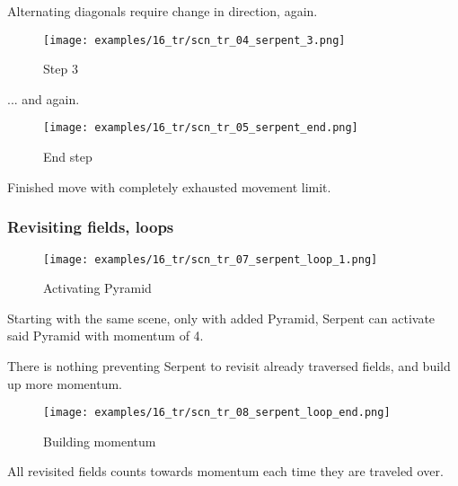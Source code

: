 Alternating diagonals require change in direction, again.

\clearpage %

\noindent
\begin{wrapfigure}[1]{l}{0.4\textwidth}
\centering
\texttt{[image: examples/16\_tr/scn\_tr\_04\_serpent\_3.png]}
\caption{Step 3}
\label{fig:scn_tr_04_serpent_3}
\end{wrapfigure}
... and again.

\vspace*{0.27\textheight}
\noindent
\begin{wrapfigure}[4]{l}{0.4\textwidth}
\centering
\texttt{[image: examples/16\_tr/scn\_tr\_05\_serpent\_end.png]}
\caption{End step}
\label{fig:scn_tr_05_serpent_end}
\end{wrapfigure}
Finished move with completely exhausted movement limit.

\clearpage %

\subsubsection*{Revisiting fields, loops}

\noindent
\begin{wrapfigure}[8]{l}{0.4\textwidth}
\centering
\texttt{[image: examples/16\_tr/scn\_tr\_07\_serpent\_loop\_1.png]}
\caption{Activating Pyramid}
\label{fig:scn_tr_07_serpent_loop_1}
\end{wrapfigure}
Starting with the same scene, only with added Pyramid, Serpent can
activate said Pyramid with momentum of 4.

There is nothing preventing Serpent to revisit already traversed fields,
and build up more momentum.

\vspace*{0.07\textheight}
\noindent
\begin{wrapfigure}[8]{l}{0.4\textwidth}
\centering
\texttt{[image: examples/16\_tr/scn\_tr\_08\_serpent\_loop\_end.png]}
\caption{Building momentum}
\label{fig:scn_tr_08_serpent_loop_end}
\end{wrapfigure}
All revisited fields counts towards momentum each time they are traveled
over.

